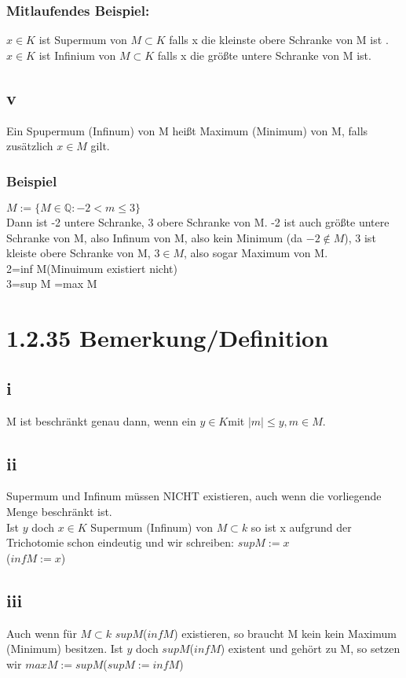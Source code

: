 \documentclass[11pt]{scrartcl}
\begin{document}
\subsubsection*{Mitlaufendes Beispiel:}
$x \in K$ ist Supermum von $M \subset K$ falls x die kleinste obere Schranke von M ist . \\
$x \in K$ ist Infinium von $M \subset K$ falls x die größte untere Schranke von M ist. \\

\subsection{v}
Ein Spupermum (Infinum) von M heißt Maximum (Minimum) von M, falls zusätzlich $x \in M$ gilt.

\subsubsection*{Beispiel}
$M := \{ M \in \mathbb{Q} : -2 < m \leq 3 \}$ \\
Dann ist -2 untere Schranke, 3 obere Schranke von M. -2 ist auch größte untere Schranke von M, also Infinum von M, also kein Minimum (da $-2 \notin M$), 3 ist kleiste obere Schranke von M, $3 \in M$, also sogar Maximum von M. \\
2=inf M(Minuimum existiert nicht) \\
3=sup M =max M

\section{1.2.35 Bemerkung/Definition}
\subsection{i}
M ist beschränkt genau dann, wenn ein $y \in K$mit $\mid m \mid \leq y, m \in M$.
\subsection{ii}
Supermum und Infinum müssen NICHT existieren, auch wenn die vorliegende Menge beschränkt ist. \\
Ist $y$ doch $x \in K$ Supermum (Infinum) von $M \subset k$ so ist x aufgrund der Trichotomie schon eindeutig und wir schreiben:
$sup M := x$ \\
($inf M := x$)
\subsection{iii}
Auch wenn für $M \subset k$ $sup M$($inf M$) existieren, so braucht M kein kein Maximum (Minimum) besitzen. Ist $y$ doch $sup M $($inf M$) existent und gehört zu M, so setzen wir $max M := sup M$($sup M := inf M$) 
\end{document}
